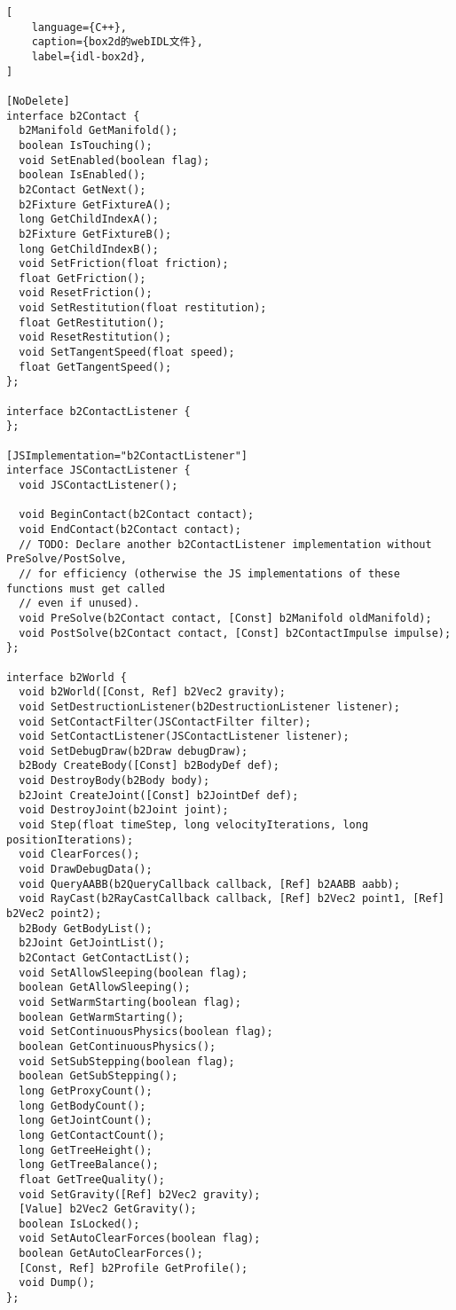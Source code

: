 \begin{lstlisting}[
    language={C++},
    caption={box2d的webIDL文件},
    label={idl-box2d},
]

[NoDelete]
interface b2Contact {
  b2Manifold GetManifold();
  boolean IsTouching();
  void SetEnabled(boolean flag);
  boolean IsEnabled();
  b2Contact GetNext();
  b2Fixture GetFixtureA();
  long GetChildIndexA();
  b2Fixture GetFixtureB();
  long GetChildIndexB();
  void SetFriction(float friction);
  float GetFriction();
  void ResetFriction();
  void SetRestitution(float restitution);
  float GetRestitution();
  void ResetRestitution();
  void SetTangentSpeed(float speed);
  float GetTangentSpeed();
};

interface b2ContactListener {
};

[JSImplementation="b2ContactListener"]
interface JSContactListener {
  void JSContactListener();

  void BeginContact(b2Contact contact);
  void EndContact(b2Contact contact);
  // TODO: Declare another b2ContactListener implementation without PreSolve/PostSolve,
  // for efficiency (otherwise the JS implementations of these functions must get called
  // even if unused).
  void PreSolve(b2Contact contact, [Const] b2Manifold oldManifold);
  void PostSolve(b2Contact contact, [Const] b2ContactImpulse impulse);
};

interface b2World {
  void b2World([Const, Ref] b2Vec2 gravity);
  void SetDestructionListener(b2DestructionListener listener);
  void SetContactFilter(JSContactFilter filter);
  void SetContactListener(JSContactListener listener);
  void SetDebugDraw(b2Draw debugDraw);
  b2Body CreateBody([Const] b2BodyDef def);
  void DestroyBody(b2Body body);
  b2Joint CreateJoint([Const] b2JointDef def);
  void DestroyJoint(b2Joint joint);
  void Step(float timeStep, long velocityIterations, long positionIterations);
  void ClearForces();
  void DrawDebugData();
  void QueryAABB(b2QueryCallback callback, [Ref] b2AABB aabb);
  void RayCast(b2RayCastCallback callback, [Ref] b2Vec2 point1, [Ref] b2Vec2 point2);
  b2Body GetBodyList();
  b2Joint GetJointList();
  b2Contact GetContactList();
  void SetAllowSleeping(boolean flag);
  boolean GetAllowSleeping();
  void SetWarmStarting(boolean flag);
  boolean GetWarmStarting();
  void SetContinuousPhysics(boolean flag);
  boolean GetContinuousPhysics();
  void SetSubStepping(boolean flag);
  boolean GetSubStepping();
  long GetProxyCount();
  long GetBodyCount();
  long GetJointCount();
  long GetContactCount();
  long GetTreeHeight();
  long GetTreeBalance();
  float GetTreeQuality();
  void SetGravity([Ref] b2Vec2 gravity);
  [Value] b2Vec2 GetGravity();
  boolean IsLocked();
  void SetAutoClearForces(boolean flag);
  boolean GetAutoClearForces();
  [Const, Ref] b2Profile GetProfile();
  void Dump();
};


\end{lstlisting}
